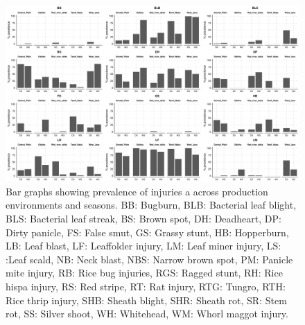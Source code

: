 \begin{landscape}
\begin{figure}
\centering
\includegraphics[height = 1\textwidth]{figures/barplot1/barplot1.pdf}
\caption[Bar graphs showing  prevalence of injuries a across production environments and seasons.]{Bar graphs showing  prevalence of injuries a across production environments and seasons. BB: Bugburn, BLB: Bacterial leaf blight, BLS: Bacterial leaf streak, BS: Brown spot, DH: Deadheart, DP: Dirty panicle, FS: False smut, GS: Grassy stunt, HB: Hopperburn, LB: Leaf blast, LF: Leaffolder injury, LM: Leaf miner injury, LS: :Leaf scald, NB: Neck blast, NBS:  Narrow brown spot, PM: Panicle mite injury, RB: Rice bug injuries, RGS: Ragged stunt, RH: Rice hispa injury, RS: Red stripe, RT: Rat injury, RTG: Tungro, RTH: Rice thrip injury, SHB: Sheath blight, SHR: Sheath rot, SR: Stem rot, SS: Silver shoot, WH: Whitehead, WM: Whorl maggot injury.}
\label{fig:barplot1}
\end{figure}    
\end{landscape} 
    
